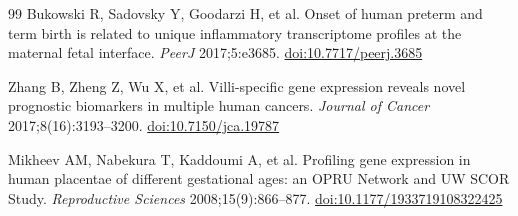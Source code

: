 \documentclass[11pt,a4paper]{article}
\newcommand{\doi}[1]{\href{https://doi.org/#1}{doi:#1}}
\begin{document}
\begin{thebibliography}{99}
Bukowski R, Sadovsky Y, Goodarzi H, et al.
Onset of human preterm and term birth is related to unique
inflammatory transcriptome profiles at the maternal fetal
interface.
\textit{PeerJ} 2017;5:e3685.
\doi{10.7717/peerj.3685}

Zhang B, Zheng Z, Wu X, et al.
Villi-specific gene expression reveals novel prognostic
biomarkers in multiple human cancers.
\textit{Journal of Cancer} 2017;8(16):3193--3200.
\doi{10.7150/jca.19787}

Mikheev AM, Nabekura T, Kaddoumi A, et al.
Profiling gene expression in human placentae of different
gestational ages: an OPRU Network and UW SCOR Study.
\textit{Reproductive Sciences} 2008;15(9):866--877.
\doi{10.1177/1933719108322425}

\end{thebibliography}
\end{document}
